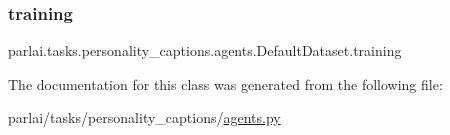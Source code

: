 \subsubsection{\texorpdfstring{training}{training}}
{\footnotesize\ttfamily parlai.\+tasks.\+personality\+\_\+captions.\+agents.\+Default\+Dataset.\+training}



The documentation for this class was generated from the following file\+:\begin{DoxyCompactItemize}
\item 
parlai/tasks/personality\+\_\+captions/\hyperlink{parlai_2tasks_2personality__captions_2agents_8py}{agents.\+py}\end{DoxyCompactItemize}
